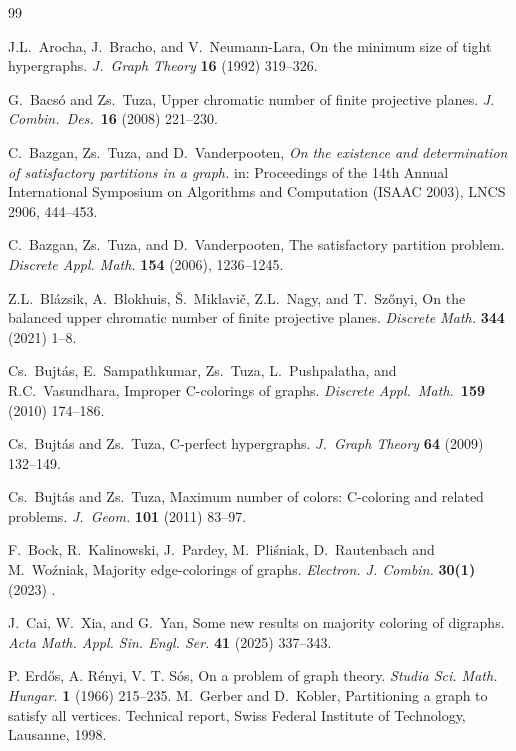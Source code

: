 \documentclass{article}
\theoremstyle{definition}
\begin{document}
\begin{thebibliography}{99}

J.L.\ Arocha, J.\ Bracho, and V.\ Neumann-Lara, 
On the minimum size of tight hypergraphs. 
\emph{J.\ Graph Theory} \textbf{16} (1992) 319--326. %

G.\ Bacs\'o and Zs.\ Tuza, Upper chromatic number of finite projective planes. \emph{J. Combin.\ Des.}\ \textbf{16} (2008) 221--230.

C.\ Bazgan, Zs.\ Tuza, and D.\ Vanderpooten, \emph{On the existence and determination of satisfactory partitions in a graph.} in: Proceedings of the 14th Annual International Symposium on Algorithms and Computation (ISAAC 2003), LNCS 2906,  444--453.

 C.\ Bazgan,  Zs.\ Tuza, and D.\ Vanderpooten, The satisfactory partition problem. \emph{Discrete Appl. Math.} \textbf{154} (2006), 1236--1245.

Z.L.\ Bl\' azsik, A.\ Blokhuis, \v{S}.\ Miklavi\v{c}, Z.L.\ Nagy, and T.\ Sz\H{o}nyi, On the balanced upper chromatic number of finite projective planes. \emph{Discrete Math.} \textbf{344} (2021) 1--8.

Cs.\ Bujtás, E.\ Sampathkumar, Zs.\ Tuza, L.\ Pushpalatha, and R.C.\ Vasundhara, Improper C-colorings of graphs. \emph{Discrete Appl.\ Math.}\ \textbf{159} (2010) 174--186.

Cs.\ Bujt\' as and Zs.\ Tuza, C-perfect hypergraphs. \emph{J.\ Graph Theory} \textbf{64} (2009) 132--149.

Cs.\ Bujtás and Zs.\ Tuza, Maximum number of colors: C-coloring and related problems. \emph{J.\ Geom.} \textbf{101} (2011) 83--97.

F.\ Bock, R.\ Kalinowski, J.\ Pardey, M.\ Pliśniak, D.\ Rautenbach and M.\ Woźniak, Majority edge-colorings of graphs. \emph{Electron. J. Combin.} \textbf{30(1)} (2023) .

J.\ Cai, W.\ Xia, and G.\ Yan, Some new results on majority coloring of digraphs. \emph{Acta Math. Appl. Sin. Engl. Ser.} \textbf{41} (2025) 337--343.

 P. Erd\H{o}s, A. R\'enyi, V. T. S\'os, On a problem of graph theory. \emph{Studia Sci. Math. Hungar.} \textbf{1} (1966) 215--235.
M.\ Gerber and D.\ Kobler, Partitioning a graph to satisfy all vertices. Technical
report, Swiss Federal Institute of Technology, Lausanne, 1998.


\end{thebibliography}
\end{document}
